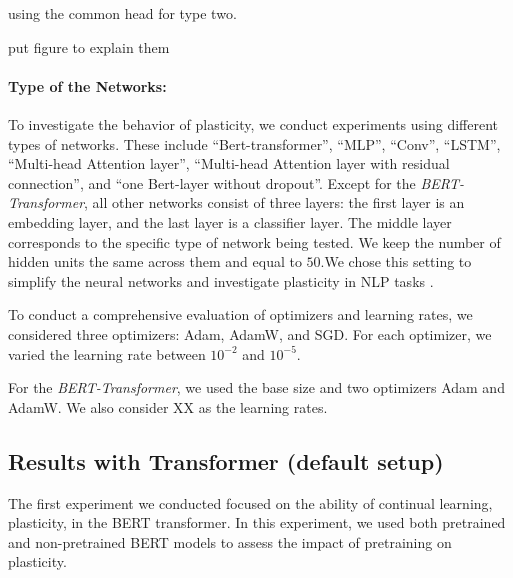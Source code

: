 using the common head for type two.

put figure to explain them

\paragraph{Type of the Networks:}
To investigate the behavior of plasticity, we conduct experiments using different types of networks. These include ``Bert-transformer'', ``MLP'', ``Conv'', ``LSTM'', ``Multi-head Attention layer'',  ``Multi-head Attention layer with residual connection'', and ``one Bert-layer without dropout''.  
Except for the \textit{BERT-Transformer}, all other networks consist of three layers: the first layer is an embedding layer, and the last layer is a classifier layer. The middle layer corresponds to the specific type of network being tested. We keep the number of hidden units the same across them and equal to $50$.We chose this setting to simplify the neural networks and investigate plasticity in NLP tasks .


To conduct a comprehensive evaluation of optimizers and learning rates, we considered three optimizers: Adam, AdamW, and SGD. For each optimizer, we varied the learning rate between $10^{-2}$ and $10^{-5}$.

For the \textit{BERT-Transformer}, we used the base size and two optimizers Adam and AdamW. We also consider {\color{red}XX} as the learning rates. 

\begin{itemize}
\end{itemize}


\subsection{Results with Transformer (default setup)}

The first experiment we conducted focused on the ability of continual learning, plasticity, in the BERT transformer. In this experiment, we used both pretrained and non-pretrained BERT models to assess the impact of pretraining on plasticity.

